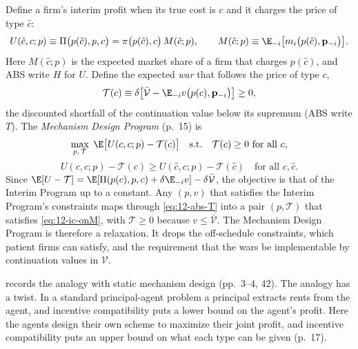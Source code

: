 Define a firm's interim profit when its true cost is $c$ and it charges the price of type $\hat c$:
\begin{equation}\label{eq:12-abs-U}
U(\hat c, c; p) \equiv \Pi\bigl(p(\hat c), p, c\bigr) = \pi\bigl(p(\hat c), c\bigr)\,M(\hat c; p),
\qquad
M(\hat c; p) \equiv \E_{-i}\bigl[m_i\bigl(p(\hat c), \mathbf p_{-i}\bigr)\bigr].
\end{equation}
Here $M(\hat c; p)$ is the expected market share of a firm that charges $p(\hat c)$, and ABS write $H$ for $U$. Define
the expected \emph{war} that follows the price of type $c$,
\begin{equation}\label{eq:12-abs-T}
\mathcal T(c) \equiv \delta\bigl[\bar{\mathcal V} - \E_{-i}v\bigl(p(c), \mathbf p_{-i}\bigr)\bigr] \ge 0 ,
\end{equation}
the discounted shortfall of the continuation value below its supremum (ABS write $T$). The \emph{Mechanism Design
Program} (p.~15) is
\begin{equation}\label{eq:12-abs-mdp}
\max_{p,\,\mathcal T}\;\E\bigl[U(c, c; p) - \mathcal T(c)\bigr]
\quad\text{s.t.}\quad
\mathcal T(c) \ge 0 \text{ for all } c,
\end{equation}
\begin{equation*}\tag{IC-onM}\label{eq:12-ic-onM}
U(c, c; p) - \mathcal T(c) \ge U(\hat c, c; p) - \mathcal T(\hat c) \quad\text{for all } c, \hat c .
\end{equation*}
Since $\E[U - \mathcal T] = \E[\Pi(p(c), p, c) + \delta\E_{-i}v] - \delta\bar{\mathcal V}$, the objective is that of
the Interim Program up to a constant. Any $(p, v)$ that satisfies the Interim Program's constraints maps through
\eqref{eq:12-abs-T} into a pair $(p, \mathcal T)$ that satisfies \eqref{eq:12-ic-onM}, with $\mathcal T \ge 0$
because $v \le \bar{\mathcal V}$. The Mechanism Design Program is therefore a relaxation. It drops the off-schedule
constraints, which patient firms can satisfy, and the requirement that the wars be implementable by continuation
values in $\mathcal V$.

 records the analogy with static mechanism design (pp.~3--4, 42). The analogy has a twist.
In a standard principal-agent problem a principal extracts rents from the agent, and incentive compatibility puts a
lower bound on the agent's profit. Here the agents design their own scheme to maximize their joint profit, and
incentive compatibility puts an upper bound on what each type can be given (p.~17).

